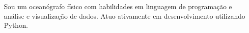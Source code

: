 \documentclass[9pt]{developercv} %
\begin{document}

\begin{minipage}[t]{0.6\textwidth} %

Sou um oceanógrafo físico com habilidades em linguagem de programação e análise e visualização de dados. Atuo ativamente em desenvolvimento utilizando Python.
\end{minipage}
\hspace{0.3cm}
\hfill %
\begin{minipage}[t]{0.5\textwidth} %
	
	\vspace{-\baselineskip} %
	\vspace{-0.9cm}
	\begin{barchart}{5.5}
	\end{barchart}
\end{minipage}
\vspace{-0.1cm}
\begin{center}
\end{center}

\vspace{-0.2cm}
\end{document}
